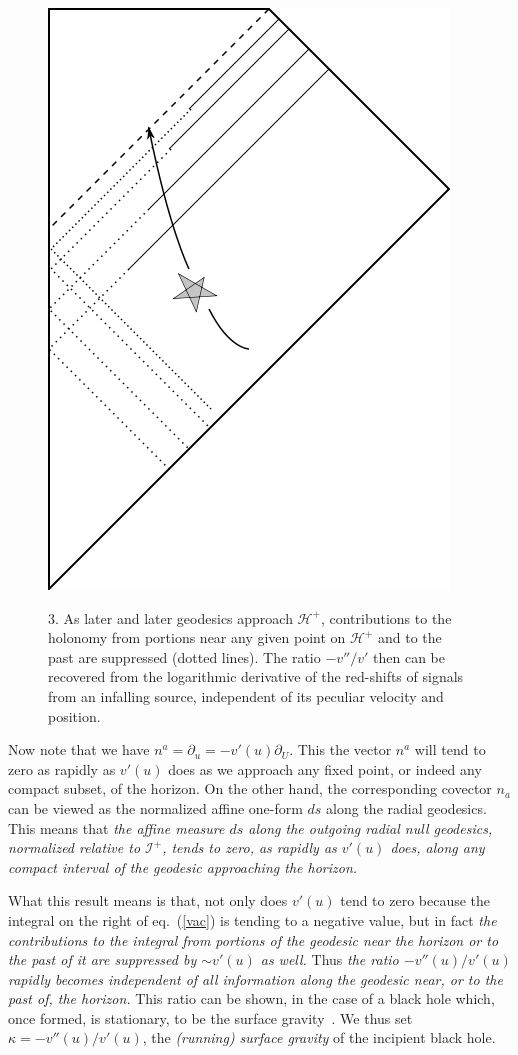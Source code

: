 \documentclass[
%
draft    %
,numberedheadings 
,bibliocites
  ]
  {aipproc}
\newcommand{\scrif}{{{\mathscr I}^{+}}}
\newcommand{\Hf}{{{\mathscr H}^{+}}} %
\newcommand{\vv}{{v}}
\begin{document}
\begin{figure}
\vspace{-1.5em}
  \begin{flushright}
{\includegraphics[width=.35\textwidth]{HorApp.png}}
\makebox[.35\textwidth]{$\ $ }
\vspace{3em}
\parbox{.35\textwidth}{3.  As later and later geodesics approach $\Hf$, contributions to the holonomy from portions near any given point on $\Hf$ and to the past are suppressed (dotted lines). 
The ratio $-\vv ''/\vv '$ then can be recovered from the logarithmic derivative of the red-shifts of signals from an infalling source,
independent of its peculiar velocity and position.}
\end{flushright}
\vspace{-4em}
\label{fig:spherhola}
\end{figure}

Now note that we have $n^a=\partial _u=-\vv'(u)\partial _U$.  This the vector $n^a$ will tend to zero as rapidly as $\vv' (u)$ does as we approach any fixed point, or indeed any compact subset, of the horizon.  
On the other hand, the corresponding covector $n_a$ can be viewed as the normalized affine one-form $ds$ along the radial geodesics.  
This means that {\em the affine measure $ds$ along the outgoing radial null geodesics, normalized relative to $\scrif$, tends to zero, as rapidly as $\vv '(u)$ does, along any compact interval
of the geodesic approaching the horizon.}

What this result means is that, not only does $\vv '(u)$ tend to zero because the integral on the right of eq.~(\ref{vac}) is tending to a negative value, but in fact {\em the contributions to the integral from portions of the geodesic near the horizon or to the past of it are suppressed by $\sim \vv' (u)$ as well.}  Thus {\em the ratio $-\vv ''(u) /\vv' (u)$ rapidly becomes independent of all information along the geodesic near, or to the past of, the horizon.}  This ratio can be shown, in the case of a black hole which, once formed, is stationary, to be the surface gravity~\citep{Helfer:2001}.  We thus set $\kappa =-\vv''(u)/\vv' (u)$, the {\em (running) surface gravity} of the incipient black hole.
\end{document}
